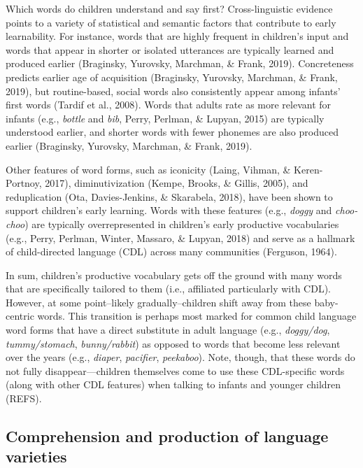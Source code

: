 \documentclass[10pt, letterpaper]{article}
\begin{document}
Which words do children understand and say first? Cross-linguistic
evidence points to a variety of statistical and semantic factors that
contribute to early learnability. For instance, words that are highly
frequent in children's input and words that appear in shorter or
isolated utterances are typically learned and produced earlier
(Braginsky, Yurovsky, Marchman, \& Frank, 2019). Concreteness predicts
earlier age of acquisition (Braginsky, Yurovsky, Marchman, \& Frank,
2019), but routine-based, social words also consistently appear among
infants' first words (Tardif et al., 2008). Words that adults rate as
more relevant for infants (e.g., \emph{bottle} and \emph{bib}, Perry,
Perlman, \& Lupyan, 2015) are typically understood earlier, and shorter
words with fewer phonemes are also produced earlier (Braginsky,
Yurovsky, Marchman, \& Frank, 2019).

Other features of word forms, such as iconicity (Laing, Vihman, \&
Keren-Portnoy, 2017), diminutivization (Kempe, Brooks, \& Gillis, 2005),
and reduplication (Ota, Davies-Jenkins, \& Skarabela, 2018), have been
shown to support children's early learning. Words with these features
(e.g., \emph{doggy} and \emph{choo-choo}) are typically overrepresented
in children's early productive vocabularies (e.g., Perry, Perlman,
Winter, Massaro, \& Lupyan, 2018) and serve as a hallmark of
child-directed language (CDL) across many communities (Ferguson, 1964).

In sum, children's productive vocabulary gets off the ground with many
words that are specifically tailored to them (i.e., affiliated
particularly with CDL). However, at some point--likely
gradually--children shift away from these baby-centric words. This
transition is perhaps most marked for common child language word forms
that have a direct substitute in adult language (e.g., \emph{doggy/dog},
\emph{tummy/stomach}, \emph{bunny/rabbit}) as opposed to words that
become less relevant over the years (e.g., \emph{diaper},
\emph{pacifier}, \emph{peekaboo}). Note, though, that these words do not
fully disappear---children themselves come to use these CDL-specific
words (along with other CDL features) when talking to infants and
younger children (REFS).

\hypertarget{comprehension-and-production-of-language-varieties}{%
\subsection{Comprehension and production of language
varieties}\label{comprehension-and-production-of-language-varieties}}
\end{document}
